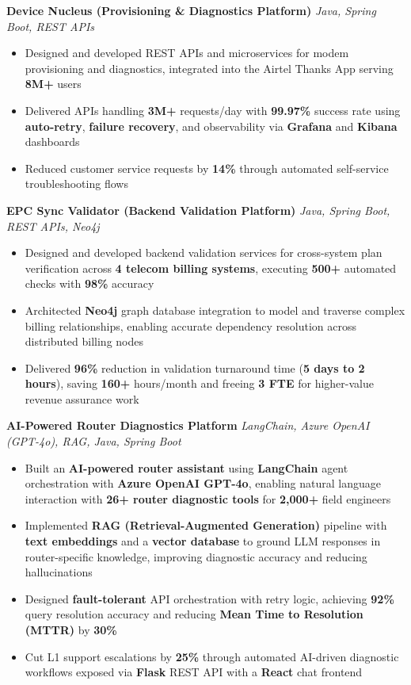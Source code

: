 \documentclass[letterpaper,11pt]{article}
\newcommand{\resumeItem}[1]{
  \item\small{{#1 \vspace{-2pt}}}
}
\newcommand{\resumeItemListStart}{\begin{itemize}}
\newcommand{\resumeItemListEnd}{\end{itemize}\vspace{-5pt}}
\begin{document}
      \vspace{4pt}
      \textbf{\small Device Nucleus (Provisioning \& Diagnostics Platform)} \hfill \textit{\small Java, Spring Boot, REST APIs} \\
      \vspace{-2pt}
      \resumeItemListStart
        \resumeItem{Designed and developed REST APIs and microservices for modem provisioning and diagnostics, integrated into the Airtel Thanks App serving \textbf{8M+} users}
        \resumeItem{Delivered APIs handling \textbf{3M+} requests/day with \textbf{99.97\%} success rate using \textbf{auto-retry}, \textbf{failure recovery}, and observability via \textbf{Grafana} and \textbf{Kibana} dashboards}
        \resumeItem{Reduced customer service requests by \textbf{14\%} through automated self-service troubleshooting flows}
      \resumeItemListEnd

      \vspace{4pt}
      \textbf{\small EPC Sync Validator (Backend Validation Platform)} \hfill \textit{\small Java, Spring Boot, REST APIs, Neo4j} \\
      \vspace{-2pt}
      \resumeItemListStart
        \resumeItem{Designed and developed backend validation services for cross-system plan verification across \textbf{4 telecom billing systems}, executing \textbf{500+} automated checks with \textbf{98\%} accuracy}
        \resumeItem{Architected \textbf{Neo4j} graph database integration to model and traverse complex billing relationships, enabling accurate dependency resolution across distributed billing nodes}
        \resumeItem{Delivered \textbf{96\%} reduction in validation turnaround time (\textbf{5 days to 2 hours}), saving \textbf{160+} hours/month and freeing \textbf{3 FTE} for higher-value revenue assurance work}
      \resumeItemListEnd

      \vspace{4pt}
      \textbf{\small AI-Powered Router Diagnostics Platform} \hfill \textit{\small LangChain, Azure OpenAI (GPT-4o), RAG, Java, Spring Boot} \\
      \vspace{-2pt}
      \resumeItemListStart
        \resumeItem{Built an \textbf{AI-powered router assistant} using \textbf{LangChain} agent orchestration with \textbf{Azure OpenAI GPT-4o}, enabling natural language interaction with \textbf{26+ router diagnostic tools} for \textbf{2,000+} field engineers}
        \resumeItem{Implemented \textbf{RAG (Retrieval-Augmented Generation)} pipeline with \textbf{text embeddings} and a \textbf{vector database} to ground LLM responses in router-specific knowledge, improving diagnostic accuracy and reducing hallucinations}
        \resumeItem{Designed \textbf{fault-tolerant} API orchestration with retry logic, achieving \textbf{92\%} query resolution accuracy and reducing \textbf{Mean Time to Resolution (MTTR)} by \textbf{30\%}}
        \resumeItem{Cut L1 support escalations by \textbf{25\%} through automated AI-driven diagnostic workflows exposed via \textbf{Flask} REST API with a \textbf{React} chat frontend}
      \resumeItemListEnd
\end{document}
